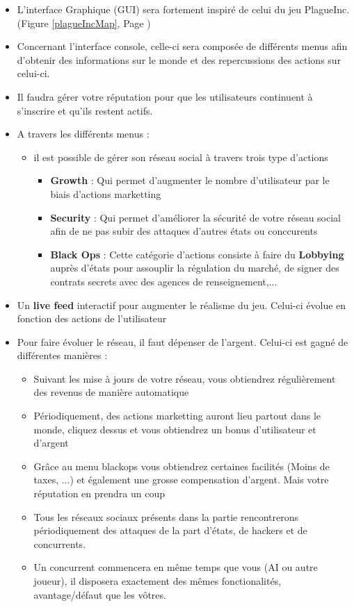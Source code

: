 \begin{itemize}
    \item L'interface Graphique (GUI) sera fortement inspiré de celui du jeu PlagueInc. (Figure \ref{plagueIncMap}, Page \pageref{plagueIncMap})
    \item Concernant l'interface console, celle-ci sera composée de différents menus afin d'obtenir des informations sur le monde et des repercussions des actions sur celui-ci.
    
    \item Il faudra gérer votre réputation pour que les utilisateurs continuent à s'inscrire et qu'ils restent actifs.
    
    \item A travers les différents menus :
    
    \begin{itemize}
        \item il est possible de gérer son réseau social à travers trois type d'actions
    
        \begin{itemize}
            \item \textbf{Growth} : Qui permet d'augmenter le nombre d'utilisateur par le biais d'actions marketting
            \item \textbf{Security} : Qui permet d'améliorer la sécurité de votre réseau social afin de ne pas subir des attaques d'autres états ou conccurents
            \item \textbf{Black Ops} : Cette catégorie d'actions consiste à faire du \textbf{Lobbying} auprès d'états pour assouplir la régulation du marché, de signer des contrats secrets avec des agences de renseignement,...
        \end{itemize}
        \end{itemize}
        \item{Un \textbf{live feed} interactif pour augmenter le réalisme du jeu. Celui-ci évolue en fonction des actions de l'utilisateur}
        \item Pour faire évoluer le réseau, il faut dépenser de l'argent. Celui-ci est gagné de différentes manières : 
        \begin{itemize}
            \item Suivant les mise à jours de votre réseau, vous obtiendrez régulièrement des revenus de manière automatique
            \item Périodiquement, des actions marketting auront lieu partout dans le monde, cliquez dessus et vous obtiendrez un bonus d'utilisateur et d'argent
            \item Grâce au menu blackops vous obtiendrez certaines facilités (Moins de taxes, ...) et également une grosse compensation d'argent. Mais votre réputation en prendra un coup
        \item Tous les réseaux sociaux présents dans la partie rencontrerons périodiquement des attaques de la part d'états, de hackers et de concurrents.
        \item Un concurrent commencera en même temps que vous (AI ou autre joueur), il disposera exactement des mêmes fonctionalités, avantage/défaut que les vôtres.
    \end{itemize}
    

\end{itemize}
